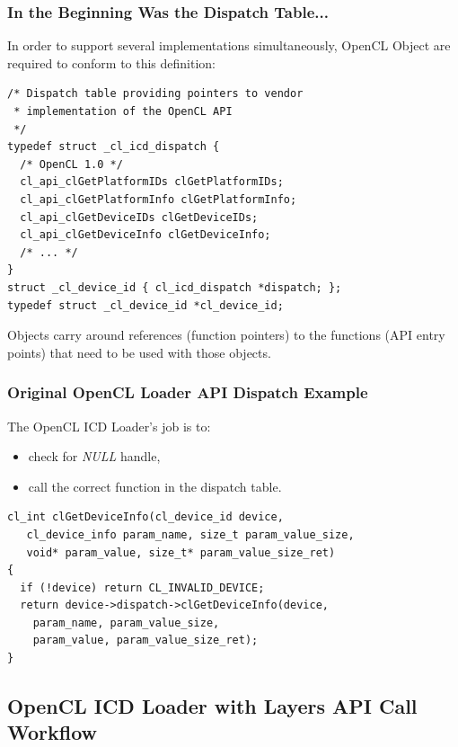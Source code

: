 \documentclass{beamer}
\begin{document}
\begin{frame}[fragile]
  \frametitle{In the Beginning Was the Dispatch Table...}
  In order to support several implementations simultaneously, OpenCL Object are
  required to conform to this definition:
  \tiny
  \begin{verbatim}
/* Dispatch table providing pointers to vendor
 * implementation of the OpenCL API
 */
typedef struct _cl_icd_dispatch {
  /* OpenCL 1.0 */
  cl_api_clGetPlatformIDs clGetPlatformIDs;
  cl_api_clGetPlatformInfo clGetPlatformInfo;
  cl_api_clGetDeviceIDs clGetDeviceIDs;
  cl_api_clGetDeviceInfo clGetDeviceInfo;
  /* ... */
}
struct _cl_device_id { cl_icd_dispatch *dispatch; };
typedef struct _cl_device_id *cl_device_id;
\end{verbatim}
  \normalsize
  Objects carry around references (function pointers) to the functions (API
  entry points) that need to be used with those objects.
\end{frame}

\begin{frame}[fragile]
  \frametitle{Original OpenCL Loader API Dispatch Example}
  The OpenCL ICD Loader's job is to:
  \begin{itemize}
    \item check for \textit{NULL} handle,
    \item call the correct function in the dispatch table.
  \end{itemize}
  \tiny
  \begin{verbatim}
cl_int clGetDeviceInfo(cl_device_id device,
   cl_device_info param_name, size_t param_value_size,
   void* param_value, size_t* param_value_size_ret)
{
  if (!device) return CL_INVALID_DEVICE;
  return device->dispatch->clGetDeviceInfo(device,
    param_name, param_value_size,
    param_value, param_value_size_ret);
}
\end{verbatim}
\end{frame}

\subsection[Layer API Call]{OpenCL ICD Loader with Layers API Call Workflow}
\end{document}
